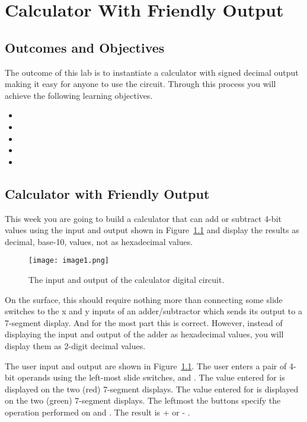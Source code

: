 \chapter{Calculator With Friendly Output}
\label{chapter:calc}
\graphicspath{{./Lab06Calculator/Fig}}

\section{Outcomes and Objectives}

The outcome of this lab is to instantiate a calculator with signed
decimal output making it easy for anyone to use the circuit.
Through this process you will achieve the following
learning objectives.
\begin{itemize}
	\item {}
	\item {}
	\item {}
	\item {}
	\item{}
\end{itemize}



\section{Calculator with Friendly Output}

This week you are going to build a calculator that can add or
subtract 4-bit values using the input and output shown in 
Figure~\ref{fig:calcDevBoard} and display the results as
decimal, base-10, values, not as hexadecimal values.

\begin{figure}[ht]
\texttt{[image:  image1.png]}
\caption{The input and output of the calculator digital circuit.}
\label{fig:calcDevBoard}
\end{figure}

On the surface, this should require nothing more
than connecting some slide switches to the x and y inputs of an
adder/subtractor which sends its output to a 7-segment display. And for
the most part this is correct. However, instead of displaying the input
and output of the adder as hexadecimal values, you will display them as
2-digit decimal values. 

The user input and output are shown in Figure~\ref{fig:calcDevBoard}.
The user enters a pair of 4-bit operands using the left-most slide
switches,  and . The value entered for
 is displayed on the two (red) 
7-segment displays. The value entered for  is displayed
on the two (green)  7-segment displays. The leftmost
the  buttons specify the operation performed on
 and . The result is  +
 or  - . 



